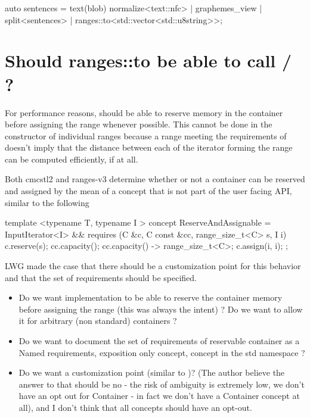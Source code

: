 \documentclass{wg21}
\begin{document}
\begin{colorblock}
    auto sentences =
        text(blob)
        normalize<text::nfc> |
        graphemes_view |
        split<sentences> | ranges::to<std::vector<std::u8string>>;
\end{colorblock}


\section{Should ranges::to be able to call / ?}

For performance reasons,  should be able to reserve memory in the container before assigning the range whenever possible.
This cannot be done in the constructor of individual ranges because a range meeting the requirements of  
doesn't imply that the distance between each of the iterator forming the range can be computed efficiently, if at all. 

Both cmcstl2 and ranges-v3 determine whether or not a container can be reserved and assigned by the mean of a  concept that is not part of the user facing API, similar to the following


\begin{colorblock}
template <typename T, typename I >
concept ReserveAndAssignable = 
	InputIterator<I> && requires (C &c, C const &cc, range_size_t<C> s, I i) {
		c.reserve(s);
		cc.capacity();
		{ cc.capacity() } -> range_size_t<C>;
		c.assign(i, i);
};
\end{colorblock}

LWG made the case that there should be a customization point for this behavior and that the set of requirements should be specified.

\begin{itemize}
\item Do we want implementation to be able to reserve the container memory before assigning the range (this was always the intent) ? Do we want to allow it for arbitrary (non standard) containers ?


\item Do we want to document the set of requirements of reservable container as a Named requirements, exposition only concept, concept in the std namespace ?
\item Do we want a customization point (similar to )? (The author believe the answer to that should be no - the risk of ambiguity is extremely low, we don't have an opt out for Container - in fact we don't have a Container concept at all), and I don't think that all concepts should have an opt-out.
\end{itemize}
\end{document}

